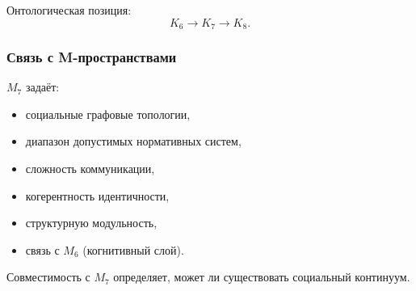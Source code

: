 Онтологическая позиция:
\[
K_6 \to K_7 \to K_8.
\]

\subsubsection{Связь с M-пространствами}

$M_7$ задаёт:
\begin{itemize}
    \item социальные графовые топологии,
    \item диапазон допустимых нормативных систем,
    \item сложность коммуникации,
    \item когерентность идентичности,
    \item структурную модульность,
    \item связь с $M_6$ (когнитивный слой).
\end{itemize}

Совместимость с $M_7$ определяет, может ли существовать социальный континуум.
